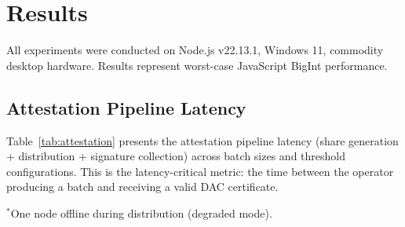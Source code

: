 
\section{Results}

All experiments were conducted on Node.js v22.13.1, Windows 11, commodity
desktop hardware. Results represent worst-case JavaScript BigInt performance.

\subsection{Attestation Pipeline Latency}

Table~\ref{tab:attestation} presents the attestation pipeline latency (share
generation + distribution + signature collection) across batch sizes and
threshold configurations. This is the latency-critical metric: the time
between the operator producing a batch and receiving a valid DAC certificate.

\begin{table}[htbp]
\centering
\caption{Attestation Pipeline Latency by Configuration}
\label{tab:attestation}
\begin{flushleft}
\small $^*$One node offline during distribution (degraded mode).
\end{flushleft}
\end{table}

